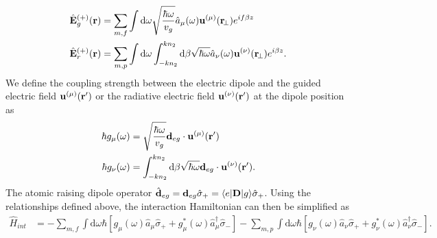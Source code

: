 \documentclass[preprint,aps,pra,onecolumn]{revtex4-1} %
\begin{document}
\begin{align}
\hat{\mathbf{E}}_g^{(+)}(\mathbf{r}) &= \sum_{m,f} \int \mathrm{d}\omega\sqrt{\frac{\hbar \omega}{v_g}} \hat{a}_\mu (\omega) \mathbf{u}^{(\mu)}(\mathbf{r}\!_\perp) e^{if\beta z}\\
\hat{\mathbf{E}}_r^{(+)}(\mathbf{r}) &= \sum_{m,p} \int \mathrm{d}\omega\int_{-kn_2}^{kn_2}\mathrm{d}\beta \sqrt{\hbar \omega} \hat{a}_\nu (\omega) \mathbf{u}^{(\nu)}(\mathbf{r}\!_\perp) e^{i\beta z}.
\end{align}
We define the coupling strength between the electric dipole and the guided electric field $\mathbf{u}^{(\mu)}(\mathbf{r}')$ or the radiative electric field $ \mathbf{u}^{(\nu)}(\mathbf{r}') $ at the dipole position as
\begin{align}
\hbar g_\mu(\omega) &= \sqrt{\frac{\hbar \omega}{v_g}} \mathbf{d}_{eg}\cdot\mathbf{u}^{(\mu)}(\mathbf{r}') \\
\hbar g_\nu(\omega) &= \int_{-kn_2}^{kn_2}\mathrm{d}\beta \sqrt{\hbar \omega} \mathbf{d}_{eg}\cdot\mathbf{u}^{(\nu)}(\mathbf{r}').
\end{align}
The atomic raising dipole operator $\hat{\mathbf{d}}_{eg}=\mathbf{d}_{eg}\hat{\sigma}_+=\langle{e}\rvert\mathbf{D}\lvert{g}\rangle\hat{\sigma}_+$. Using the relationships defined above, the interaction Hamiltonian can then be simplified as
\begin{align}
\hat{H}_{int} &= -\sum_{m,f} \int\mathrm{d}\omega \hbar\left[g_\mu(\omega)\hat{a}_\mu\hat{\sigma}_+ +g_\mu^*(\omega)\hat{a}^\dagger_\mu\hat{\sigma}_- \right]
-\sum_{m,p} \int\mathrm{d}\omega \hbar\left[g_\nu(\omega)\hat{a}_\nu \hat{\sigma}_+ +g_\nu^*(\omega)\hat{a}^\dagger_\nu\hat{\sigma}_- \right]. 
\end{align}
\end{document}
